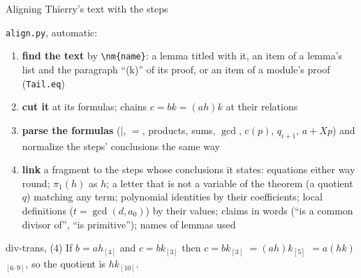 \documentclass[10pt,aspectratio=169]{beamer}
\newcommand{\file}[1]{\texttt{#1}}
\begin{document}
\begin{frame}{Aligning Thierry's text with the steps}

\footnotesize
\file{align.py}, automatic:

\begin{enumerate}
\item \textbf{find the text} by \texttt{\textbackslash nm\{name\}}: a lemma titled with it,
  an item of a lemma's list and the paragraph ``(k)'' of its proof, or an
  item of a module's proof (\texttt{Tail.eq})
\item \textbf{cut it} at its formulas; chains $c = bk = (ah)k$ at their
  relations
\item \textbf{parse the formulas} ($\mid$, $=$, products, sums, $\gcd$,
  $\mathrm{c}(p)$, $q_{i+1}$, $a+Xp$) and normalize the steps' conclusions
  the same way
\item \textbf{link} a fragment to the steps whose conclusions it states:
  equations either way round; $\pi_1(h)$ as $h$; a letter that is not a
  variable of the theorem (a quotient $q$) matching any term; polynomial
  identities by their coefficients; local definitions ($t=\gcd(d,a_0)$)
  by their values; claims in words (``is a common divisor of'', ``is
  primitive''); names of lemmas used
\end{enumerate}

\begin{block}{div-trans, (4)}
\colorbox{yellow!30}{If $b = ah$}$_{[4]}$
\colorbox{yellow!30}{and $c = bk$}$_{[3]}$
then \colorbox{yellow!30}{$c = bk$}$_{[3]}$
\colorbox{yellow!30}{$= (ah)k$}$_{[5]}$
\colorbox{yellow!30}{$= a(hk)$}$_{[6\text{--}9]}$,
\colorbox{yellow!30}{so the quotient is $hk$}$_{[10]}$.
\end{block}

\end{frame}
\end{document}
